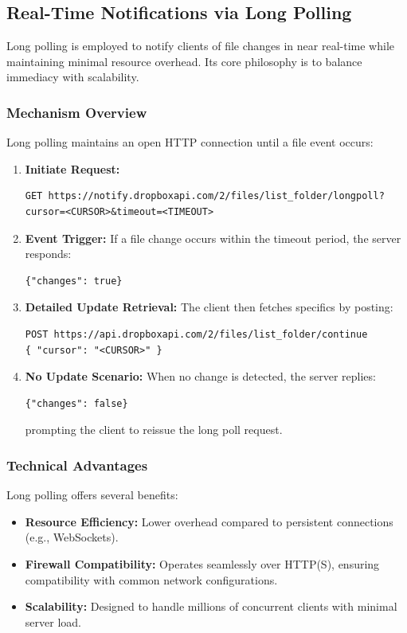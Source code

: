 \subsection{Real-Time Notifications via Long Polling}

Long polling is employed to notify clients of file changes in near real-time while maintaining minimal resource overhead. Its core philosophy is to balance immediacy with scalability.

\subsubsection{Mechanism Overview}

Long polling maintains an open HTTP connection until a file event occurs:
\begin{enumerate}
    \item \textbf{Initiate Request:}
    \begin{lstlisting}
GET https://notify.dropboxapi.com/2/files/list_folder/longpoll?cursor=<CURSOR>&timeout=<TIMEOUT>
    \end{lstlisting}
    
    \item \textbf{Event Trigger:} If a file change occurs within the timeout period, the server responds:
    \begin{lstlisting}
{"changes": true}
    \end{lstlisting}
    
    \item \textbf{Detailed Update Retrieval:} The client then fetches specifics by posting:
    \begin{lstlisting}
POST https://api.dropboxapi.com/2/files/list_folder/continue
{ "cursor": "<CURSOR>" }
    \end{lstlisting}
    
    \item \textbf{No Update Scenario:} When no change is detected, the server replies:
    \begin{lstlisting}
{"changes": false}
    \end{lstlisting}
    prompting the client to reissue the long poll request.
\end{enumerate}

\subsubsection{Technical Advantages}
Long polling offers several benefits:
\begin{itemize}
    \item \textbf{Resource Efficiency:} Lower overhead compared to persistent connections (e.g., WebSockets).
    \item \textbf{Firewall Compatibility:} Operates seamlessly over HTTP(S), ensuring compatibility with common network configurations.
    \item \textbf{Scalability:} Designed to handle millions of concurrent clients with minimal server load.
\end{itemize}

